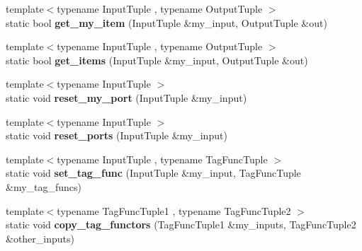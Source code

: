 \begin{DoxyCompactItemize}
\item 
\hypertarget{structinternal_1_1join__helper_3_011_01_4_a1e3f346658a63778065608d100e6993b}{}{\footnotesize template$<$typename Input\+Tuple , typename Output\+Tuple $>$ }\\static bool {\bfseries get\+\_\+my\+\_\+item} (Input\+Tuple \&my\+\_\+input, Output\+Tuple \&out)\label{structinternal_1_1join__helper_3_011_01_4_a1e3f346658a63778065608d100e6993b}

\item 
\hypertarget{structinternal_1_1join__helper_3_011_01_4_a6752a6a8ff9d061db6054917fe84b75d}{}{\footnotesize template$<$typename Input\+Tuple , typename Output\+Tuple $>$ }\\static bool {\bfseries get\+\_\+items} (Input\+Tuple \&my\+\_\+input, Output\+Tuple \&out)\label{structinternal_1_1join__helper_3_011_01_4_a6752a6a8ff9d061db6054917fe84b75d}

\item 
\hypertarget{structinternal_1_1join__helper_3_011_01_4_a1d7634eeef0c4510c83f9929ae01b160}{}{\footnotesize template$<$typename Input\+Tuple $>$ }\\static void {\bfseries reset\+\_\+my\+\_\+port} (Input\+Tuple \&my\+\_\+input)\label{structinternal_1_1join__helper_3_011_01_4_a1d7634eeef0c4510c83f9929ae01b160}

\item 
\hypertarget{structinternal_1_1join__helper_3_011_01_4_a3f919fdaa7817161466ad665ab360061}{}{\footnotesize template$<$typename Input\+Tuple $>$ }\\static void {\bfseries reset\+\_\+ports} (Input\+Tuple \&my\+\_\+input)\label{structinternal_1_1join__helper_3_011_01_4_a3f919fdaa7817161466ad665ab360061}

\item 
\hypertarget{structinternal_1_1join__helper_3_011_01_4_a4aeb34dde60f0eb016a56bfab7a70cee}{}{\footnotesize template$<$typename Input\+Tuple , typename Tag\+Func\+Tuple $>$ }\\static void {\bfseries set\+\_\+tag\+\_\+func} (Input\+Tuple \&my\+\_\+input, Tag\+Func\+Tuple \&my\+\_\+tag\+\_\+funcs)\label{structinternal_1_1join__helper_3_011_01_4_a4aeb34dde60f0eb016a56bfab7a70cee}

\item 
\hypertarget{structinternal_1_1join__helper_3_011_01_4_a1aa6b0c3d77dc8d3a379de291eed9079}{}{\footnotesize template$<$typename Tag\+Func\+Tuple1 , typename Tag\+Func\+Tuple2 $>$ }\\static void {\bfseries copy\+\_\+tag\+\_\+functors} (Tag\+Func\+Tuple1 \&my\+\_\+inputs, Tag\+Func\+Tuple2 \&other\+\_\+inputs)\label{structinternal_1_1join__helper_3_011_01_4_a1aa6b0c3d77dc8d3a379de291eed9079}


\end{DoxyCompactItemize}
